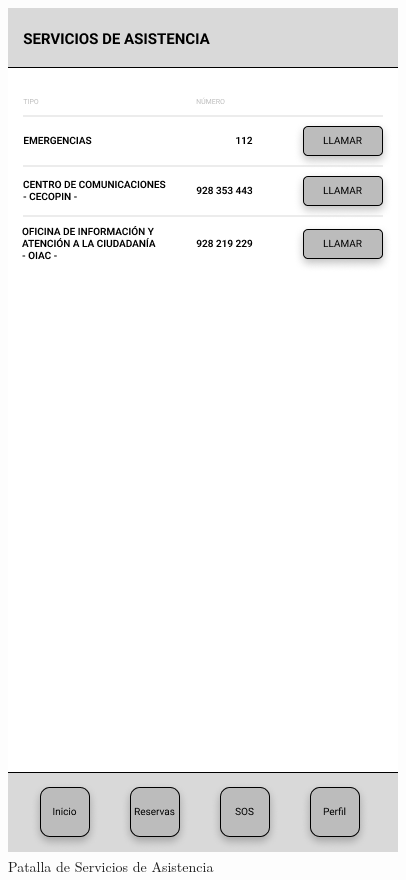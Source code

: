 \documentclass{scrartcl}
\begin{document}
        \begin{figure}[H]
            \centerline{\includegraphics[scale=0.20]{wiresos}}
            \caption{Patalla de Servicios de Asistencia}
            \label{fig:wiresos}
        \end{figure}
    \newpage
\end{document}
